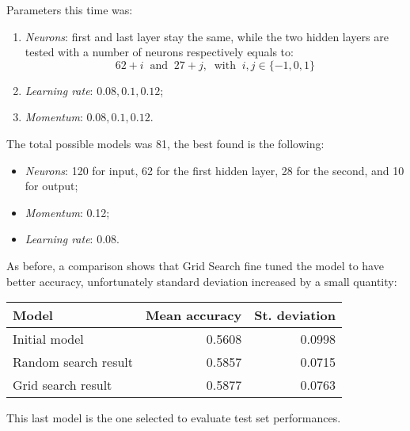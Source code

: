 Parameters this time was:
\begin{enumerate}
    \item \emph{Neurons}: first and last layer stay the same, while 
    the two hidden layers are tested with a number of neurons respectively 
    equals to: 
    $$62 + i\;\;\text{and}\;\;27 + j,\;\;\text{with}\;\; i, j \in \{-1,0,1\}$$
    \item \emph{Learning rate}: $0.08, 0.1, 0.12$;
    \item \emph{Momentum}: $0.08, 0.1, 0.12$.
\end{enumerate}

The total possible models was 81, the best found is the following:
\begin{itemize}
    \item \emph{Neurons}: 120 for input, 62 for the first hidden layer, 28 for the second, and 10 for output; 
    \item \emph{Momentum}: 0.12;
    \item \emph{Learning rate}: 0.08.
\end{itemize}
As before, a comparison shows that Grid Search fine tuned the model 
to have better accuracy, unfortunately standard deviation increased by a small 
quantity:
\begin{center}
    \begin{tabular}{ |l|r|r| } 
        \hline
        Model & Mean accuracy & St. deviation \\
        \hline
        Initial model & 0.5608& 0.0998\\
        Random search result & 0.5857 & 0.0715 \\
        Grid search result & 0.5877 & 0.0763 \\
        \hline
    \end{tabular}
\end{center}
This last model is the one selected to evaluate test set performances.
\newpage